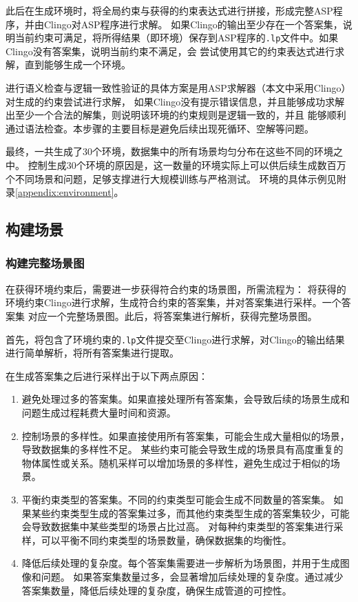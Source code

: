 此后在生成环境时，将全局约束与获得的约束表达式进行拼接，形成完整ASP程序，并由Clingo对ASP程序进行求解。
如果Clingo的输出至少存在一个答案集，说明当前约束可满足，将所得结果（即环境）保存到ASP程序的\texttt{.lp}文件中。如果Clingo没有答案集，说明当前约束不满足，会
尝试使用其它的约束表达式进行求解，直到能够生成一个环境。

进行语义检查与逻辑一致性验证的具体方案是用ASP求解器（本文中采用Clingo）对生成的约束尝试进行求解，
如果Clingo没有提示错误信息，并且能够成功求解出至少一个合法的解集，则说明该环境的约束规则是逻辑一致的，并且
能够顺利通过语法检查。本步骤的主要目标是避免后续出现死循环、空解等问题。

最终，一共生成了30个环境，数据集中的所有场景均匀分布在这些不同的环境之中。
控制生成30个环境的原因是，这一数量的环境实际上可以供后续生成数百万个不同场景和问题，足够支撑进行大规模训练与严格测试。
环境的具体示例见附录\ref{appendix:environment}。
\subsection{构建场景}
\subsubsection{构建完整场景图}
在获得环境约束后，需要进一步获得符合约束的场景图，所需流程为：
将获得的环境约束Clingo进行求解，生成符合约束的答案集，并对答案集进行采样。一个答案集
对应一个完整场景图。此后，将答案集进行解析，获得完整场景图。

首先，将包含了环境约束的\texttt{.lp}文件提交至Clingo进行求解，对Clingo的输出结果进行简单解析，将所有答案集进行提取。

在生成答案集之后进行采样出于以下两点原因：
\begin{enumerate}[nosep]
\item 避免处理过多的答案集。如果直接处理所有答案集，会导致后续的场景生成和问题生成过程耗费大量时间和资源。
\item 控制场景的多样性。如果直接使用所有答案集，可能会生成大量相似的场景，导致数据集的多样性不足。
某些约束可能会导致生成的场景具有高度重复的物体属性或关系。随机采样可以增加场景的多样性，避免生成过于相似的场景。
\item 平衡约束类型的答案集。不同的约束类型可能会生成不同数量的答案集。
如果某些约束类型生成的答案集过多，而其他约束类型生成的答案集较少，可能会导致数据集中某些类型的场景占比过高。
对每种约束类型的答案集进行采样，可以平衡不同约束类型的场景数量，确保数据集的均衡性。
\item 降低后续处理的复杂度。每个答案集需要进一步解析为场景图，并用于生成图像和问题。
如果答案集数量过多，会显著增加后续处理的复杂度。通过减少答案集数量，降低后续处理的复杂度，确保生成管道的可控性。
\end{enumerate}

